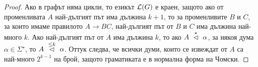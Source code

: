 \begin{proof}
  Ако в графът няма цикли, то езикът $\mathcal{L}(G)$ е краен, защото ако от променливата $A$ най-дългият път има дължина $k+1$,
  то за променливите $B$ и $C$, за които имаме правилото $A\to BC$, най-дългият път от $B$ и $C$ има дължина най-много $k$.
  Ако най-дългият път от $A$ има дължина $k$, то ако $A ~\stackrel{{\star}}{\lhd}~ \alpha$, за някоя дума $\alpha \in \Sigma^\star$,
  то $A ~\stackrel{{\leq k}}{\lhd}~ \alpha$. Оттук следва, че всички думи, които се извеждат от $A$ са най-много $2^{k-1}$ на брой,
  защото граматиката е в нормална форма на Чомски.
\end{proof}


